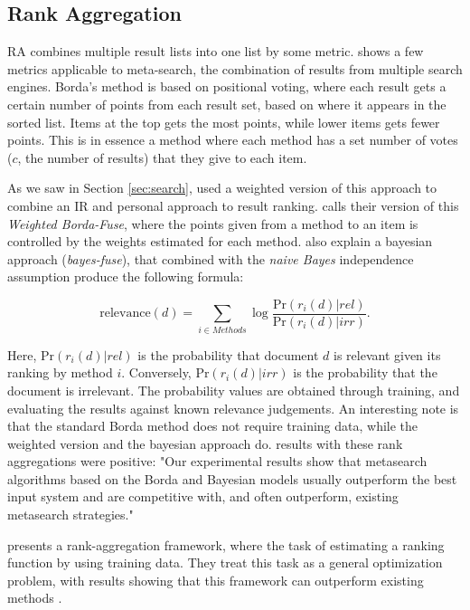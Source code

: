 \subsection{Rank Aggregation}

RA combines multiple result lists into one list by some metric.
\cite{Dwork2001} shows a few metrics applicable to meta-search, the combination of results from multiple search engines.
Borda's method \cite[p6]{Dwork2001} is based on positional voting, where each result gets a certain number of points from each result set,
based on where it appears in the sorted list. Items at the top gets the most points, while lower items gets fewer points.
This is in essence a method where each method has a set number of votes ($c$, the number of results) that they give to each item.

As we saw in Section \ref{sec:search}, \citet[p3]{Xu2008} used a weighted version
of this approach to combine an IR and personal approach to result ranking.
\citet[p3]{Aslam2001} calls their version of this \emph{Weighted Borda-Fuse},
where the points given from a method to an item is controlled
by the weights estimated for each method.
\citet[p4]{Aslam2001} also explain a bayesian approach (\emph{bayes-fuse}),
that combined with the \emph{naive Bayes} independence assumption 
produce the following formula:

\begin{equation*}
  \mathrm{relevance}(d)  = \sum_{i \in Methods} \log 
    \frac{ \mathrm{Pr}(r_i(d) | rel) }{ \mathrm{Pr}(r_i(d) | irr) }.
\end{equation*}

Here, $\mathrm{Pr}(r_i(d) | rel)$ is the probability that document $d$
is relevant given its ranking by method $i$.
Conversely, $\mathrm{Pr}(r_i(d) | irr)$ is the probability that the document 
is irrelevant. The probability values are obtained through training,
and evaluating the results against known relevance judgements.
An interesting note is that the standard Borda method does not require training data,
while the weighted version and the bayesian approach do.
\citet[p1]{Aslam2001} results with these rank aggregations were positive:
"Our experimental results show that metasearch algorithms based on the 
Borda and Bayesian models usually outperform the best input system 
and are competitive with, and often outperform, 
existing metasearch strategies."

\cite{Liu2007} presents a rank-aggregation framework, where
the task of estimating a ranking function by using training data.
They treat this task as a general optimization problem, with results
showing that this framework can outperform existing methods \cite[p7]{Liu2007}.

